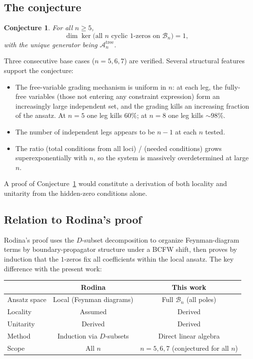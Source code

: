 \documentclass[11pt]{article}
\theoremstyle{plain}
\newtheorem{conjecture}[theorem]{Conjecture}
\theoremstyle{definition}
\newcommand{\cA}{\mathcal{A}}
\newcommand{\cB}{\mathcal{B}}
\begin{document}
\subsection{The conjecture}

\begin{conjecture}\label{conj:main}
For all $n \ge 5$,
\[
\dim \ker\!\big(\text{all $n$ cyclic $1$-zeros on } \cB_n\big) = 1,
\]
with the unique generator being $\cA_n^{\mathrm{tree}}$.
\end{conjecture}

Three consecutive base cases ($n = 5, 6, 7$) are verified. Several structural features
support the conjecture:
\begin{itemize}[nosep]
\item The free-variable grading mechanism is uniform in $n$: at each leg, the fully-free
      variables (those not entering any constraint expression) form an increasingly
      large independent set, and the grading kills an increasing fraction of the
      ansatz. At $n = 5$ one leg kills $60\%$; at $n = 8$ one leg kills $\sim 98\%$.
\item The number of independent legs appears to be $n - 1$ at each $n$ tested.
\item The ratio (total conditions from all loci) / (needed conditions) grows
      superexponentially with $n$, so the system is massively overdetermined at large
      $n$.
\end{itemize}

A proof of Conjecture~\ref{conj:main} would constitute a derivation of both locality
and unitarity from the hidden-zero conditions alone.

\subsection{Relation to Rodina's proof}

Rodina's proof \cite{Rodina2024} uses the $D$-subset decomposition to organize
Feynman-diagram terms by boundary-propagator structure under a BCFW shift, then proves
by induction that the $1$-zeros fix all coefficients within the local ansatz. The key
difference with the present work:

\begin{center}
\begin{tabular}{lcc}
\toprule
& Rodina & This work \\
\midrule
Ansatz space & Local (Feynman diagrams) & Full $\cB_n$ (all poles) \\
Locality & Assumed & Derived \\
Unitarity & Derived & Derived \\
Method & Induction via $D$-subsets & Direct linear algebra \\
Scope & All $n$ & $n = 5, 6, 7$ (conjectured for all $n$) \\
\bottomrule
\end{tabular}
\end{center}
\end{document}
